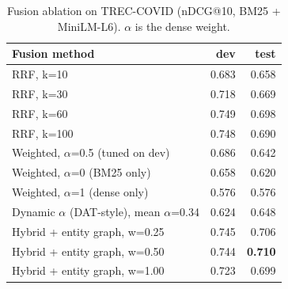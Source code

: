 \begin{table}[t]
\centering\small
\begin{tabular}{lrr}
\toprule
Fusion method & dev & test \\
\midrule
RRF, k=10 & 0.683 & 0.658 \\
RRF, k=30 & 0.718 & 0.669 \\
RRF, k=60 & 0.749 & 0.698 \\
RRF, k=100 & 0.748 & 0.690 \\
Weighted, $\alpha$=0.5 (tuned on dev) & 0.686 & 0.642 \\
Weighted, $\alpha$=0 (BM25 only) & 0.658 & 0.620 \\
Weighted, $\alpha$=1 (dense only) & 0.576 & 0.576 \\
Dynamic $\alpha$ (DAT-style), mean $\alpha$=0.34 & 0.624 & 0.648 \\
Hybrid + entity graph, w=0.25 & 0.745 & 0.706 \\
Hybrid + entity graph, w=0.50 & 0.744 & \textbf{0.710} \\
Hybrid + entity graph, w=1.00 & 0.723 & 0.699 \\
\bottomrule
\end{tabular}
\caption{Fusion ablation on TREC-COVID (nDCG@10, BM25 + MiniLM-L6). $\alpha$ is the dense weight.}
\label{tab:ablation_fusion}
\end{table}

